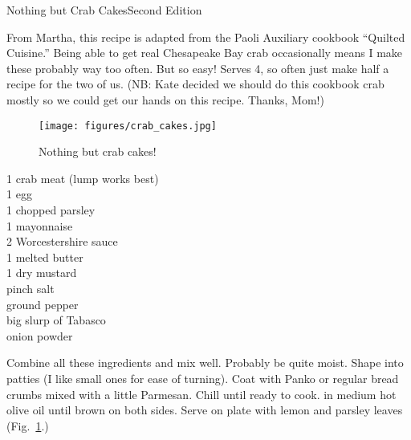 \begin{entry}{Nothing but Crab Cakes}{Second Edition}

\begin{open}
  From Martha, this recipe is adapted from the Paoli Auxiliary cookbook
  ``Quilted Cuisine.'' Being able to get real Chesapeake Bay crab occasionally
  means I make these probably way too often. But so easy! Serves 4, so often
  just make half a recipe for the two of us. (NB: Kate decided we should do
  this cookbook crab mostly so we could get our hands on this recipe. Thanks,
  Mom!)
\end{open}
\begin{figure}
    \centering
    \texttt{[image: figures/crab\_cakes.jpg]}
    \caption{Nothing but crab cakes!}
    \label{fig:crab-cakes}
\end{figure}
\begin{ingredients}
    \SI{1}{\pound} crab meat (lump works best)\\
    1 egg\\
    \SI{1}{\tblspoon} chopped parsley\\
    \SI{1}{\tblspoon} mayonnaise\\
    \SI{2}{\teaspoon} Worcestershire sauce\\
    \SI{1}{\tblspoon} melted butter\\
    \SI{1}{\teaspoon} dry mustard \\
    pinch salt\\
    ground pepper\\
    big slurp of Tabasco\\
    onion powder
\end{ingredients}
Combine all these ingredients and mix well. Probably be quite moist. Shape
into patties (I like small ones for ease of turning). Coat with Panko or
regular bread crumbs mixed with a little Parmesan. Chill until ready to
cook. \Saute in medium hot olive oil until brown on both sides.  Serve on plate with lemon and parsley leaves (Fig.~\ref{fig:crab-cakes}.)
\end{entry}

